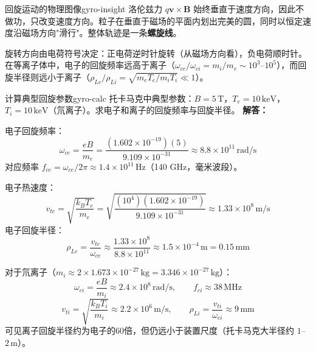 \documentclass[12pt,a4paper,openany,oneside]{book}
\newcommand{\vect}[1]{\bm{#1}}
\newcommand{\difficulty}[1]{\marginnote{\textcolor{red}{\textbf{[#1]}}}}
\begin{document}
\begin{insight}{回旋运动的物理图像}{gyro-insight}
洛伦兹力 $q\vect{v}\times\vect{B}$ 始终垂直于速度方向，因此不做功，只改变速度方向。粒子在垂直于磁场的平面内划出完美的圆，同时以恒定速度沿磁场方向"滑行"。整体轨迹是一条\textbf{螺旋线}。

旋转方向由电荷符号决定：正电荷逆时针旋转（从磁场方向看），负电荷顺时针。在等离子体中，电子的回旋频率远高于离子（$\omega_{ce}/\omega_{ci} = m_i/m_e \sim 10^3$--$10^5$），而回旋半径则远小于离子（$\rho_{Le}/\rho_{Li} = \sqrt{m_e T_e/m_i T_i} \ll 1$）。
\end{insight}

\begin{center}
\end{center}

\begin{example}{计算典型回旋参数}{gyro-calc}
\difficulty{基础}
托卡马克中典型参数：$B = 5\,\mathrm{T}$，$T_e = 10\,\mathrm{keV}$，$T_i = 10\,\mathrm{keV}$（氘离子）。求电子和离子的回旋频率与回旋半径。
\tcblower
\textbf{解答：}

电子回旋频率：
\[
\omega_{ce} = \frac{eB}{m_e} = \frac{(1.602\times 10^{-19})(5)}{9.109\times 10^{-31}} \approx 8.8\times 10^{11}\,\mathrm{rad/s}
\]
对应频率 $f_{ce} = \omega_{ce}/2\pi \approx 1.4\times 10^{11}\,\mathrm{Hz}$（140 GHz，毫米波段）。

电子热速度：
\[
v_{te} = \sqrt{\frac{k_B T_e}{m_e}} = \sqrt{\frac{(10^4)(1.602\times 10^{-19})}{9.109\times 10^{-31}}} \approx 1.33\times 10^{8}\,\mathrm{m/s}
\]
电子回旋半径：
\[
\rho_{Le} = \frac{v_{te}}{\omega_{ce}} \approx \frac{1.33\times 10^8}{8.8\times 10^{11}} \approx 1.5\times 10^{-4}\,\mathrm{m} = 0.15\,\mathrm{mm}
\]

对于氘离子（$m_i \approx 2\times 1.673\times 10^{-27}\,\mathrm{kg} = 3.346\times 10^{-27}\,\mathrm{kg}$）：
\[
\omega_{ci} = \frac{eB}{m_i} \approx 2.4\times 10^{8}\,\mathrm{rad/s}, \qquad f_{ci} \approx 38\,\mathrm{MHz}
\]
\[
v_{ti} = \sqrt{\frac{k_B T_i}{m_i}} \approx 2.2\times 10^{6}\,\mathrm{m/s}, \qquad \rho_{Li} = \frac{v_{ti}}{\omega_{ci}} \approx 9\,\mathrm{mm}
\]
可见离子回旋半径约为电子的60倍，但仍远小于装置尺度（托卡马克大半径约 $1$--$2\,\mathrm{m}$）。
\end{example}
\end{document}
